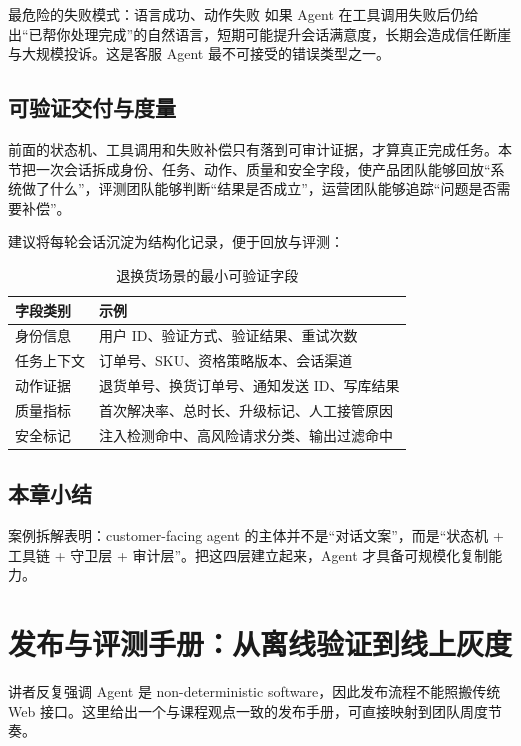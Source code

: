 \documentclass[a4paper]{article}
\begin{document}
\begin{warningbox}{最危险的失败模式：语言成功、动作失败}
如果 Agent 在工具调用失败后仍给出“已帮你处理完成”的自然语言，短期可能提升会话满意度，长期会造成信任断崖与大规模投诉。这是客服 Agent 最不可接受的错误类型之一。
\end{warningbox}

\subsection{可验证交付与度量}

前面的状态机、工具调用和失败补偿只有落到可审计证据，才算真正完成任务。本节把一次会话拆成身份、任务、动作、质量和安全字段，使产品团队能够回放“系统做了什么”，评测团队能够判断“结果是否成立”，运营团队能够追踪“问题是否需要补偿”。

建议将每轮会话沉淀为结构化记录，便于回放与评测：
\begin{table}[H]
\centering
\caption{退换货场景的最小可验证字段}
\begin{tabularx}{\textwidth}{>{\raggedright\arraybackslash}p{3.3cm} >{\raggedright\arraybackslash}X}
\toprule
字段类别 & 示例 \\
\midrule
身份信息 & 用户 ID、验证方式、验证结果、重试次数 \\
任务上下文 & 订单号、SKU、资格策略版本、会话渠道 \\
动作证据 & 退货单号、换货订单号、通知发送 ID、写库结果 \\
质量指标 & 首次解决率、总时长、升级标记、人工接管原因 \\
安全标记 & 注入检测命中、高风险请求分类、输出过滤命中 \\
\bottomrule
\end{tabularx}
\end{table}

\subsection{本章小结}

案例拆解表明：customer-facing agent 的主体并不是“对话文案”，而是“状态机 + 工具链 + 守卫层 + 审计层”。把这四层建立起来，Agent 才具备可规模化复制能力。

\section{发布与评测手册：从离线验证到线上灰度}

讲者反复强调 Agent 是 non-deterministic software，因此发布流程不能照搬传统 Web 接口。这里给出一个与课程观点一致的发布手册，可直接映射到团队周度节奏。
\end{document}
